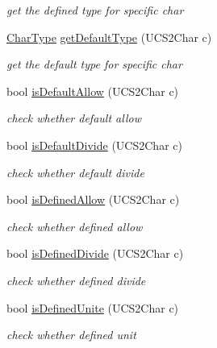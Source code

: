\begin{CompactItemize}
\begin{CompactList}\small\item\em get the defined type for specific char \item\end{CompactList}\item 
\hyperlink{namespacela__manager_aa4b42b4146948a208eabd25288ad99b}{CharType} \hyperlink{classla__manager_1_1CharTypeTable_af12cb9b55886d533da4270683655d2b}{getDefaultType} (UCS2Char c)
\begin{CompactList}\small\item\em get the default type for specific char \item\end{CompactList}\item 
bool \hyperlink{classla__manager_1_1CharTypeTable_872ee1be76a6008bf86b2255b16d3679}{isDefaultAllow} (UCS2Char c)
\begin{CompactList}\small\item\em check whether default allow \item\end{CompactList}\item 
bool \hyperlink{classla__manager_1_1CharTypeTable_8d9a80838209b03f1003a4e0e6157011}{isDefaultDivide} (UCS2Char c)
\begin{CompactList}\small\item\em check whether default divide \item\end{CompactList}\item 
bool \hyperlink{classla__manager_1_1CharTypeTable_9fcbc2d5747462459023da70ccf0631d}{isDefinedAllow} (UCS2Char c)
\begin{CompactList}\small\item\em check whether defined allow \item\end{CompactList}\item 
bool \hyperlink{classla__manager_1_1CharTypeTable_ad7404ec8db73433231eec802efea540}{isDefinedDivide} (UCS2Char c)
\begin{CompactList}\small\item\em check whether defined divide \item\end{CompactList}\item 
bool \hyperlink{classla__manager_1_1CharTypeTable_e804d650ddf512317379b6b0bdca79e3}{isDefinedUnite} (UCS2Char c)
\begin{CompactList}\small\item\em check whether defined unit \item\end{CompactList}\item 

\end{CompactItemize}
